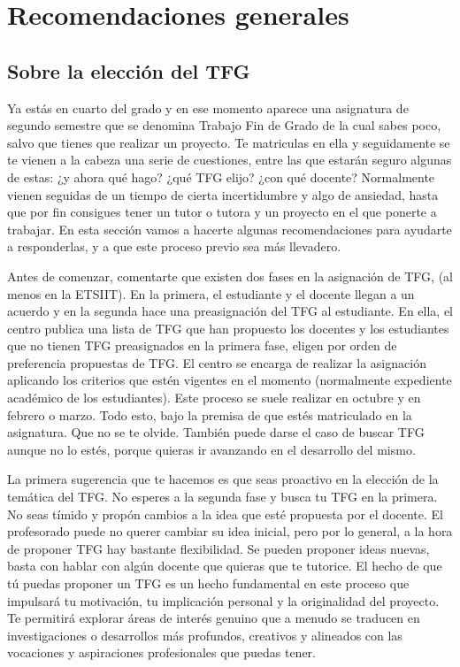 \chapter{Recomendaciones generales}
\label{cap:Recomendaciones}


\section{Sobre la elección del TFG}


Ya estás en cuarto del grado y en ese momento aparece una asignatura de segundo semestre que se denomina Trabajo Fin de Grado de la cual sabes poco, salvo que tienes que realizar un proyecto. Te matriculas en ella y seguidamente se te vienen a la cabeza una serie de cuestiones, entre las que estarán seguro algunas de estas: ¿y ahora qué hago? ¿qué TFG elijo? ¿con qué docente? Normalmente vienen seguidas de un tiempo de cierta incertidumbre y algo de ansiedad, hasta que por fin consigues tener un tutor o tutora y un proyecto en el que ponerte a trabajar. En esta sección vamos a hacerte algunas recomendaciones para ayudarte a responderlas, y a que este proceso previo sea más llevadero.

Antes de comenzar, comentarte que existen dos fases en la asignación de TFG, (al menos en la ETSIIT). En la primera, el estudiante y el docente llegan a un acuerdo y en la segunda hace una preasignación del TFG al estudiante. En ella, el centro publica una lista de TFG que han propuesto los docentes y los estudiantes que no tienen TFG preasignados en la primera fase, eligen por orden de preferencia propuestas de TFG. El centro se encarga de realizar la asignación aplicando los criterios que estén vigentes en el momento (normalmente expediente académico de los estudiantes). Este proceso se suele realizar en octubre y en febrero o marzo. Todo esto, bajo la premisa de que estés matriculado en la asignatura. Que no se te olvide. También puede darse el caso de buscar TFG aunque no lo estés, porque quieras ir avanzando en el desarrollo del mismo. 

La primera sugerencia que te hacemos es que seas proactivo en la elección de la temática del TFG. No esperes a la segunda fase y busca tu TFG en la primera. No seas tímido y propón cambios a la idea que esté propuesta por el docente. El profesorado puede no querer cambiar su idea inicial, pero por lo general, a la hora de proponer TFG hay bastante flexibilidad. Se pueden proponer ideas nuevas, basta con hablar con algún docente que quieras que te tutorice. El hecho de que tú puedas proponer un TFG es un hecho fundamental en este proceso que impulsará  tu motivación, tu implicación personal y la originalidad del proyecto. Te permitirá explorar áreas de interés genuino que a menudo se traducen en investigaciones o desarrollos más profundos, creativos y alineados con las vocaciones y aspiraciones profesionales que puedas tener.

